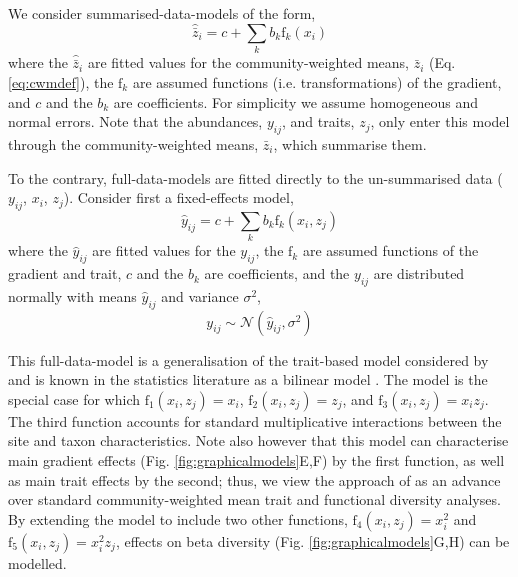 \documentclass[12pt]{ecology}
\begin{document}
We consider summarised-data-models of the form,
\begin{equation}
\hat{\bar{z}}_i = c + \sum_k b_k \mathrm{f}_k (x_i)
\end{equation}
where the $\hat{\bar{z}}_i$ are fitted values for the community-weighted means, $\bar{z}_i$ (Eq. \ref{eq:cwmdef}), the $\mathrm{f}_k$ are assumed functions (i.e. transformations) of the gradient, and $c$ and the $b_k$ are coefficients.  For simplicity we assume homogeneous and normal errors.  Note that the abundances, $y_{ij}$, and traits, $z_j$, only enter this model through the community-weighted means, $\bar{z}_i$, which summarise them.

To the contrary, full-data-models are fitted directly to the un-summarised data ($y_{ij}$, $x_i$, $z_j$).  Consider first a fixed-effects model,
\begin{equation}
\hat{y}_{ij} = c + 
	\sum_k b_k \mathrm{f}_k (x_i, z_j)
\label{eq:fixed}
\end{equation}
where the $\hat{y}_{ij}$ are fitted values for the $y_{ij}$, the $\mathrm{f}_k$ are assumed functions of the gradient and trait, $c$ and the $b_k$ are coefficients, and the $y_{ij}$ are distributed normally with means $\hat{y}_{ij}$ and variance $\sigma^2$,
\begin{equation}
y_{ij} \sim \mathcal{N}(\hat{y}_{ij},\sigma^2)
\end{equation}

This full-data-model is a generalisation of the trait-based model considered by \citet{CormontEtAl2011} and is known in the statistics literature as a bilinear model \citep{Gabriel1998}.  The \citet{CormontEtAl2011} model is the special case for which $\mathrm{f}_1(x_i, z_j) = x_i$, $\mathrm{f}_2(x_i, z_j) = z_j$, and $\mathrm{f}_3(x_i, z_j) = x_i z_j$.  The third function accounts for standard multiplicative interactions between the site and taxon characteristics.  Note also however that this model can characterise main gradient effects (Fig. \ref{fig:graphicalmodels}E,F) by the first function, as well as main trait effects by the second; thus, we view the approach of \citet{CormontEtAl2011} as an advance over standard community-weighted mean trait and functional diversity analyses.  By extending the model to include two other functions, $\mathrm{f}_4(x_i, z_j) = x_i^2$ and $\mathrm{f}_5(x_i, z_j) = x_i^2 z_j$, effects on beta diversity (Fig. \ref{fig:graphicalmodels}G,H) can be modelled.

\end{document}
